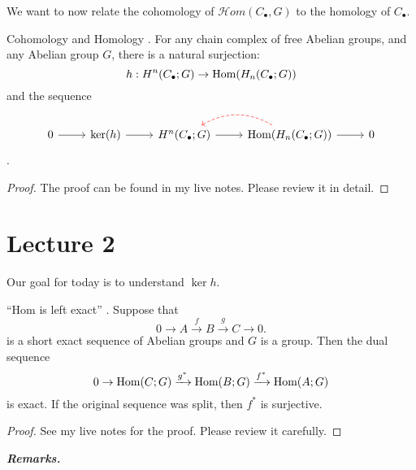 \documentclass{article}
\begin{document}
We want to now relate the cohomology of $\mathcal{H}om(C_{\bullet}, G)$ to the homology of $C_{\bullet}$.

\begin{Lemma}{Cohomology and Homology}
. For any chain complex of free Abelian groups, and any Abelian group $G$, there is a natural surjection:
\begin{equation}
  h : H^n(C_{\bullet}; G) \rightarrow \text{\normalfont Hom}(H_n(C_\bullet; G))
\end{equation}
and the sequence
\begin{equation}
  \begin{tikzcd}
    0 \ar[r] & \ker(h) \ar[r] & H^n(C_{\bullet}; G) \ar[r] & \ar[l, dashed, red, bend right=30] \text{\normalfont Hom}(H_{n}(C_{\bullet}; G)) \ar[r] & 0
  \end{tikzcd}
\end{equation}
.
\end{Lemma}

\begin{proof}
  The proof can be found in my live notes. Please review it in detail.
\end{proof}

\section{Lecture 2}

Our goal for today is to understand $\ker h$.

\begin{Lemma}{``Hom is left exact''}
.  Suppose that
\begin{equation}
  0 \rightarrow A \xrightarrow{f} B \xrightarrow{g} C \rightarrow 0.
\end{equation}
  is a short exact sequence of Abelian groups and $G$ is a group. Then the dual sequence
  \begin{equation}
    0 \rightarrow \text{\normalfont Hom} (C; G) \xrightarrow{g^{*}} \text{\normalfont Hom}(B ; G) \xrightarrow{f^{*}} \text{\normalfont Hom}(A; G)
  \end{equation}
  is exact. If the original sequence was split, then $f^{*}$ is surjective.
\end{Lemma}

\begin{proof}
  See my live notes for the proof. Please review it carefully.
\end{proof}

\textbf{\textit{Remarks.}}
\end{document}
